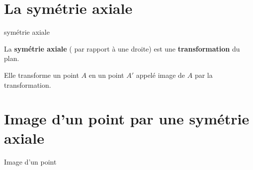 \begin{pageCours}

\section{La symétrie axiale}

\begin{DefT}{symétrie axiale}

\begin{minipage}{0.65\linewidth}
La \textbf{symétrie axiale}  ( par rapport à une droite) est une \textbf{transformation} du plan.

Elle transforme un point $A$ en un point $A'$ appelé image de $A$ par la transformation.
\end{minipage}
\begin{minipage}{0.35\linewidth}
\end{minipage}
\end{DefT}
 

 

\section{Image d'un point par une symétrie axiale}

\begin{DefT}{Image d'un point} 


\end{DefT}
\end{pageCours}
